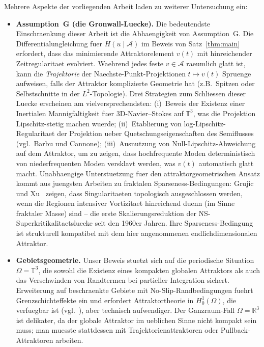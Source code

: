 \documentclass[12pt,a4paper]{article}
\theoremstyle{definition}
\theoremstyle{plain}
\theoremstyle{remark}
\begin{document}
Mehrere Aspekte der vorliegenden Arbeit laden zu weiterer Untersuchung ein:

\begin{itemize}
    \item \textbf{Assumption~G (die Gronwall-Luecke).} Die bedeutendste Einschraenkung dieser Arbeit ist die Abhaengigkeit von Assumption~G. Die Differentialungleichung fuer $H(u\mid\mathcal{A})$ im Beweis von Satz~\ref{thm:main} erfordert, dass das minimierende Attraktorelement $v(t)$ mit hinreichender Zeitregularitaet evolviert. Waehrend jedes feste $v \in \mathcal{A}$ raeumlich glatt ist, kann die \emph{Trajektorie} der Naechste-Punkt-Projektionen $t \mapsto v(t)$ Spruenge aufweisen, falls der Attraktor komplizierte Geometrie hat (z.B.\ Spitzen oder Selbstschnitte in der $L^2$-Topologie). Drei Strategien zum Schliessen dieser Luecke erscheinen am vielversprechendsten: (i)~Beweis der Existenz einer Inertialen Mannigfaltigkeit fuer 3D-Navier--Stokes auf $\mathbb{T}^3$, was die Projektion Lipschitz-stetig machen wuerde; (ii)~Etablierung von log-Lipschitz-Regularitaet der Projektion ueber Quetschungseigenschaften des Semiflusses (vgl.\ Barbu und Cannone); (iii)~Ausnutzung von Null-Lipschitz-Abweichung auf dem Attraktor, um zu zeigen, dass hochfrequente Moden deterministisch von niederfrequenten Moden versklavt werden, was $v(t)$ automatisch glatt macht.
    Unabhaengige Unterstuetzung fuer den attraktorgeometrischen Ansatz kommt aus juengsten Arbeiten zu fraktalen Sparseness-Bedingungen: Grujic und Xu~\cite{GrujicXu2025} zeigen, dass Singularitaeten topologisch ausgeschlossen werden, wenn die Regionen intensiver Vortizitaet hinreichend duenn (im Sinne fraktaler Masse) sind -- die erste Skalierungsreduktion der NS-Superkritikalitaetsluecke seit den 1960er Jahren. Ihre Sparseness-Bedingung ist strukturell kompatibel mit dem hier angenommenen endlichdimensionalen Attraktor.

    \item \textbf{Gebietsgeometrie.} Unser Beweis stuetzt sich auf die periodische Situation $\Omega = \mathbb{T}^3$, die sowohl die Existenz eines kompakten globalen Attraktors \cite{FoiasManleyRosaTemam2001} als auch das Verschwinden von Randtermen bei partieller Integration sichert. Erweiterung auf beschraenkte Gebiete mit No-Slip-Randbedingungen fuehrt Grenzschichteffekte ein und erfordert Attraktortheorie in $H^1_0(\Omega)$, die verfuegbar ist (vgl.\ \cite{Temam2001}), aber technisch aufwendiger. Der Ganzraum-Fall $\Omega = \mathbb{R}^3$ ist delikater, da der globale Attraktor im ueblichen Sinne nicht kompakt sein muss; man muesste stattdessen mit Trajektorienattraktoren oder Pullback-Attraktoren arbeiten.


\end{itemize}
\end{document}
